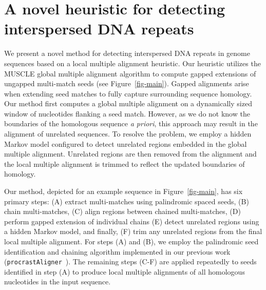 \documentclass[12pt,journal,letterpaper,onecolumn, draftcls]{IEEEtran}
\begin{document}
\section{A novel heuristic for detecting interspersed DNA repeats}
\label{section-main}
We present a novel method for detecting interspersed DNA repeats in genome sequences based on a local multiple alignment heuristic. Our heuristic utilizes the MUSCLE
global multiple alignment algorithm to compute gapped extensions of ungapped
multi-match seeds (see Figure~\ref{fig-main}). Gapped alignments arise
when extending seed matches to fully capture surrounding sequence
homology. Our method first computes a
global multiple alignment on a dynamically sized window of nucleotides
flanking a seed match.  However, as we do not know the boundaries of the
homologous sequence \textit{a priori}, this approach may result in the
alignment of unrelated sequences.  To resolve the problem, we employ a hidden Markov model configured to detect
unrelated regions embedded in the global multiple alignment.
Unrelated regions are then removed from the alignment and the
local multiple alignment is trimmed to reflect the updated boundaries
of homology.

Our method, depicted for an example sequence in
Figure~\ref{fig-main}, has six primary steps: (A) extract multi-matches using
palindromic spaced seeds, (B) chain
multi-matches, (C) align regions between chained multi-matches, (D)
perform gapped extension of individual chains (E) detect unrelated regions
using a hidden Markov model, and finally, (F) trim any unrelated regions from
the final local multiple alignment. For steps (A) and (B), we employ the palindromic seed identification
and chaining algorithm implemented in our previous work (\texttt{procrastAligner}~\cite{ref-procrast}). The remaining steps (C-F) are applied
repeatedly to seeds identified in step (A) to produce local multiple
alignments of all homologous nucleotides in the input sequence.
\end{document}
